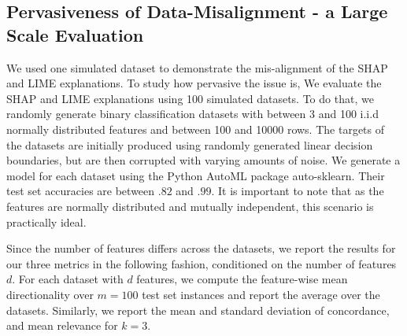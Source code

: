 \documentclass[mnsc,blindrev]{informs3}
\begin{document}
    
    
    
    
    
\subsection{Pervasiveness of Data-Misalignment - a Large Scale Evaluation}
    \label{sec:pervasive}
    We used one simulated dataset to demonstrate the mis-alignment of the SHAP and LIME explanations. To study how pervasive the issue is, %
    We evaluate the SHAP and LIME explanations using 100 simulated datasets. To do that, we randomly generate binary classification datasets with between 3 and 100 i.i.d normally distributed features and between 100 and 10000 rows.  The targets of the datasets are initially produced using randomly generated linear decision boundaries, but are then corrupted with varying amounts of noise. We generate a model for each dataset using the Python AutoML package auto-sklearn. Their test set accuracies are between $.82$ and $.99$. It is important to note that as the features are normally distributed and mutually independent, this scenario is practically ideal.  

    Since the number of features differs across the datasets, we report the results for our three metrics in the following fashion, conditioned on the number of features $d$. For each dataset with $d$ features, we compute the feature-wise mean directionality over $m=100$ test set instances and report the average over the datasets. Similarly, we report the mean and standard deviation of concordance, and mean relevance for $k=3$. 
\end{document}
